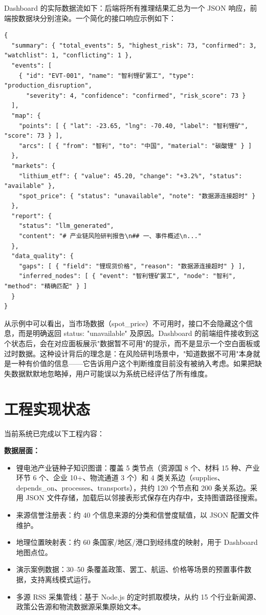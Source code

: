 \documentclass[12pt,a4paper]{ctexart}
\begin{document}
Dashboard 的实际数据流如下：后端将所有推理结果汇总为一个 JSON 响应，前端按数据块分别渲染。一个简化的接口响应示例如下：

\begin{verbatim}
{
  "summary": { "total_events": 5, "highest_risk": 73, "confirmed": 3, "watchlist": 1, "conflicting": 1 },
  "events": [
    { "id": "EVT-001", "name": "智利锂矿罢工", "type": "production_disruption",
      "severity": 4, "confidence": "confirmed", "risk_score": 73 }
  ],
  "map": {
    "points": [ { "lat": -23.65, "lng": -70.40, "label": "智利锂矿", "score": 73 } ],
    "arcs": [ { "from": "智利", "to": "中国", "material": "碳酸锂" } ]
  },
  "markets": {
    "lithium_etf": { "value": 45.20, "change": "+3.2%", "status": "available" },
    "spot_price": { "status": "unavailable", "note": "数据源连接超时" }
  },
  "report": {
    "status": "llm_generated",
    "content": "# 产业链风险研判报告\n## 一、事件概述\n..."
  },
  "data_quality": {
    "gaps": [ { "field": "锂现货价格", "reason": "数据源连接超时" } ],
    "inferred_nodes": [ { "event": "智利锂矿罢工", "node": "智利", "method": "精确匹配" } ]
  }
}
\end{verbatim}

从示例中可以看出，当市场数据（spot\_price）不可用时，接口不会隐藏这个信息，而是明确返回 status: "unavailable" 及原因。Dashboard 的前端组件接收到这个状态后，会在对应面板展示"数据暂不可用"的提示，而不是显示一个空白面板或过时数据。这种设计背后的理念是：在风险研判场景中，"知道数据不可用"本身就是一种有价值的信息——它告诉用户这个判断维度目前没有被纳入考虑。如果把缺失数据默默地忽略掉，用户可能误以为系统已经评估了所有维度。

\section{工程实现状态}

当前系统已完成以下工程内容：

\textbf{数据层面：} 
\begin{itemize}
    \item 锂电池产业链种子知识图谱：覆盖 5 类节点（资源国 8 个、材料 15 种、产业环节 6 个、企业 10+、物流通道 3 个）和 4 类关系边（supplies、depends\_on、processes、transports），共约 120 个节点和 200 条关系边。采用 JSON 文件存储，加载后以邻接表形式保存在内存中，支持图谱路径搜索。
    \item 来源信誉注册表：约 40 个信息来源的分类和信誉度赋值，以 JSON 配置文件维护。
    \item 地理位置映射表：约 60 条国家/地区/港口到经纬度的映射，用于 Dashboard 地图点位。
    \item 演示案例数据：30--50 条覆盖政策、罢工、航运、价格等场景的预置事件数据，支持离线模式运行。
    \item 多源 RSS 采集管线：基于 Node.js 的定时抓取模块，从约 15 个行业新闻源、政策公告源和物流数据源采集原始文本。
\end{itemize}
\end{document}
